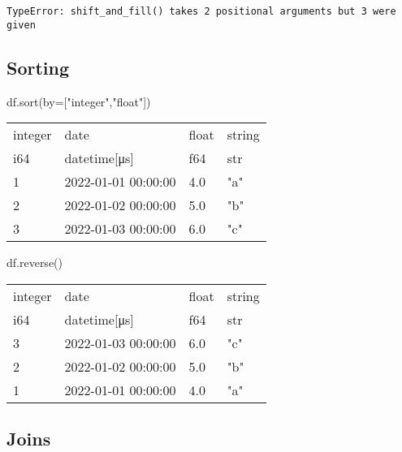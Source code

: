 \documentclass[
  letterpaper,
  DIV=11,
  numbers=noendperiod]{scrartcl}
\newenvironment{Shaded}{\begin{snugshade}}{\end{snugshade}}
\newcommand{\NormalTok}[1]{\textcolor[rgb]{0.00,0.23,0.31}{#1}}
\newcommand{\OperatorTok}[1]{\textcolor[rgb]{0.37,0.37,0.37}{#1}}
\newcommand{\StringTok}[1]{\textcolor[rgb]{0.13,0.47,0.30}{#1}}
\begin{document}
\begin{verbatim}
TypeError: shift_and_fill() takes 2 positional arguments but 3 were given
\end{verbatim}

\hypertarget{sorting}{%
\subsection{Sorting}\label{sorting}}

\begin{Shaded}
\begin{Highlighting}[]
\NormalTok{df.sort(by}\OperatorTok{=}\NormalTok{[}\StringTok{"integer"}\NormalTok{,}\StringTok{"float"}\NormalTok{])}
\end{Highlighting}
\end{Shaded}

\begin{longtable}[]{@{}llll@{}}
\toprule()
integer & date & float & string \\
i64 & datetime{[}μs{]} & f64 & str \\
\midrule()
\endhead
1 & 2022-01-01 00:00:00 & 4.0 & "a" \\
2 & 2022-01-02 00:00:00 & 5.0 & "b" \\
3 & 2022-01-03 00:00:00 & 6.0 & "c" \\
\bottomrule()
\end{longtable}

\begin{Shaded}
\begin{Highlighting}[]
\NormalTok{df.reverse()}
\end{Highlighting}
\end{Shaded}

\begin{longtable}[]{@{}llll@{}}
\toprule()
integer & date & float & string \\
i64 & datetime{[}μs{]} & f64 & str \\
\midrule()
\endhead
3 & 2022-01-03 00:00:00 & 6.0 & "c" \\
2 & 2022-01-02 00:00:00 & 5.0 & "b" \\
1 & 2022-01-01 00:00:00 & 4.0 & "a" \\
\bottomrule()
\end{longtable}

\hypertarget{sec-joins}{%
\subsection{Joins}\label{sec-joins}}
\end{document}
